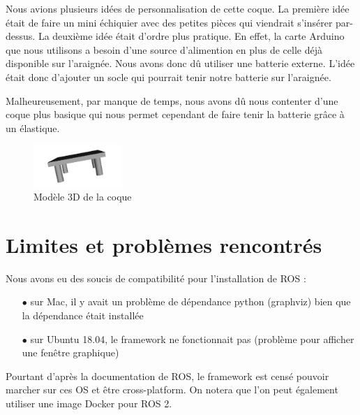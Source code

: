 Nous avions plusieurs idées de personnalisation de cette coque. La première idée était de faire un mini échiquier avec des petites 
pièces qui viendrait s’insérer par-dessus.  
La deuxième idée était d'ordre plus pratique. En effet, la carte Arduino que nous utilisons a besoin d’une source d’alimention 
en plus de celle déjà disponible sur l’araignée. Nous avons donc dû utiliser une batterie externe. 
L’idée était donc d’ajouter un socle qui pourrait tenir notre batterie sur l’araignée. 
\linebreak

Malheureusement, par manque de temps, nous avons dû nous contenter d’une coque plus basique qui nous permet cependant de 
faire tenir la batterie grâce à un élastique. 

\begin{figure}[H]
	\begin{center}
		\includegraphics[width=0.3\textwidth]{./img/coque}
		\caption{Modèle 3D de la coque}
	\end{center}
\end{figure}


		\section{Limites et problèmes rencontrés}

Nous avons eu des soucis de compatibilité pour l'installation de ROS :  
\begin{itemize}
	\item[$\bullet$] sur Mac, il y avait un problème de dépendance python (graphviz) bien que la dépendance était installée
	\item[$\bullet$]sur Ubuntu 18.04, le framework ne fonctionnait pas (problème pour afficher une fenêtre graphique)
\end{itemize}

Pourtant d'après la documentation de ROS, le framework est censé pouvoir marcher sur ces OS et être cross-platform.
On notera que l'on peut également utiliser une image Docker pour ROS 2. 
\linebreak

